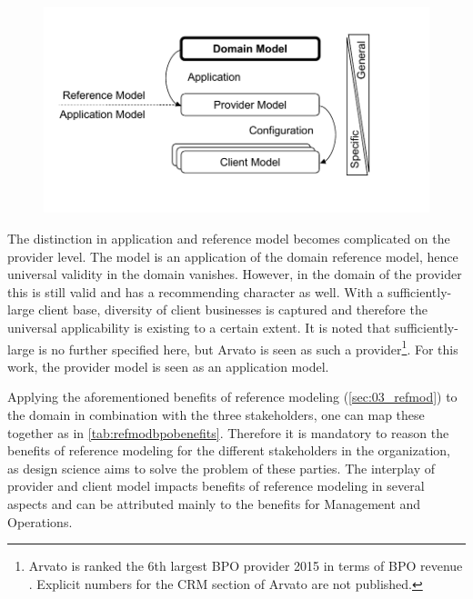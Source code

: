 \begin{figure}[caption={Model levels}, label={fig:modellevels}]
	{	\includegraphics[width=.8\textwidth]{figures/refmodlevels.pdf}}
\end{figure}

The distinction in application and reference model becomes complicated on the provider level. The model is an application of the domain reference model, hence universal validity in the domain vanishes. However, in the domain of the provider this is still valid and has a recommending character as well. With a sufficiently-large client base, diversity of client businesses is captured and therefore the universal applicability is existing to a certain extent. It is noted that sufficiently-large is no further specified here, but Arvato is seen as such a provider\footnote{Arvato is ranked the 6th largest BPO provider 2015 in terms of BPO revenue \citep{hfs2016top}. Explicit numbers for the CRM section of Arvato are not published.}. For this work, the provider model is seen as an application model. 

Applying the aforementioned benefits of reference modeling (\cf \ref{sec:03_refmod}) to the domain in combination with the three stakeholders, one can map these together as in \Tab \ref{tab:refmodbpobenefits}. Therefore it is mandatory to reason the benefits of reference modeling for the different stakeholders in the organization, as design science aims to solve the problem of these parties. The interplay of provider and client model impacts benefits of reference modeling in several aspects and can be attributed mainly to the benefits for Management and Operations.


